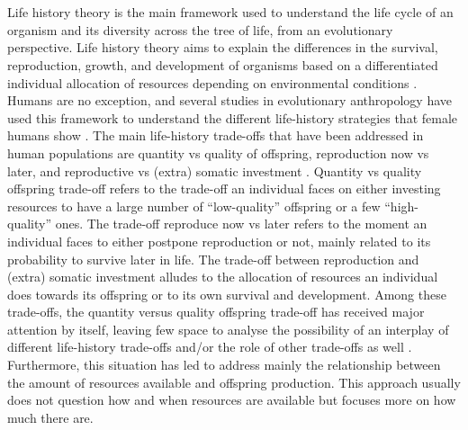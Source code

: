 \documentclass{article}
\begin{document}
\\\\
Life history theory is the main framework used to understand the life cycle of an organism and its diversity across the tree of life,  from an evolutionary perspective. Life history theory aims to explain the differences in the survival, reproduction, growth, and development of organisms based on a differentiated individual allocation of resources depending on environmental conditions \citep{stearns2000life}. Humans are no exception, and several studies in evolutionary anthropology have used this framework to understand the different life-history strategies that female humans show \citep{mace2000evolutionary,borgerhoff2012human}. The main life-history trade-offs that have been addressed in human populations are quantity vs quality of offspring, reproduction now vs later, and reproductive vs (extra) somatic investment \citep{hill1999life}. Quantity vs quality offspring trade-off refers to the trade-off an individual faces on either investing resources to have a large number of “low-quality” offspring or a few “high-quality” ones. The trade-off reproduce now vs later refers to the moment an individual faces to either postpone reproduction or not, mainly related to its probability to survive later in life. The trade-off between reproduction and (extra) somatic investment alludes to the allocation of resources an individual does towards its offspring or to its own survival and development. Among these trade-offs, the quantity versus quality offspring trade-off has received major attention by itself, leaving few space to analyse the possibility of an interplay of different life-history trade-offs and/or the role of other trade-offs as well \citep{lawson2016offspring}. Furthermore, this situation has led to address mainly the relationship between the amount of resources available and offspring production. This approach usually does not question how and when resources are available but focuses more on how much there are.
\\\\
\end{document}
